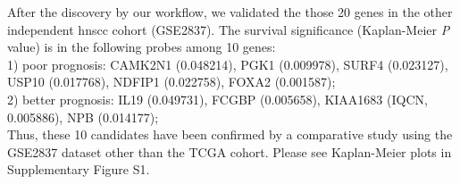 \documentclass[12pt, a4paper]{article}
\begin{document}
After the discovery by our workflow, we validated the those 20 genes in the other independent \acrshort{hnscc} cohort (GSE2837).
The survival significance (Kaplan-Meier \textit{P} value) is in the following probes among 10 genes:\\
1) poor prognosis: CAMK2N1 (0.048214), PGK1 (0.009978), SURF4 (0.023127), USP10 (0.017768), NDFIP1 (0.022758), FOXA2 (0.001587);\\ %
2) better prognosis: IL19 (0.049731), FCGBP (0.005658), KIAA1683 (IQCN, 0.005886), NPB (0.014177);\\
Thus, these 10 candidates have been confirmed by a comparative study using the GSE2837 dataset other than the TCGA cohort. Please see Kaplan-Meier plots in Supplementary Figure S1.%
\end{document}
